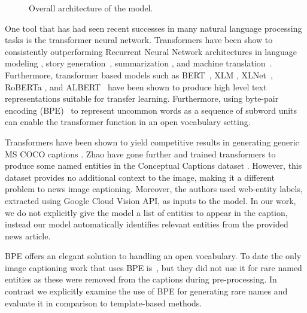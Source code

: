 
\begin{figure*}[t]
    \begin{center}
    \fbox{\rule{0pt}{2in} \rule{.9\linewidth}{0pt}}
    \end{center}
       \caption{Overall architecture of the model.}
    \label{fig:short}
 \end{figure*}

One tool that has had seen recent successes in many natural language processing
tasks is the transformer neural network.
Transformers have been show to consistently
outperforming Recurrent Neural Network architectures in language modeling
\cite{Radford2019LanguageMA},
story generation~\cite{Fan2018HierarchicalNS}, summarization
\cite{Subramanian2019OnEA}, and machine translation~\cite{Bojar2018Findings}.
Furthermore, transformer based models such as BERT~\cite{Devlin2019BERT}, XLM
\cite{Lample2019CrosslingualLM}, XLNet~\cite{Yang2019XLNetGA}, RoBERTa
\cite{Liu2019RoBERTaAR}, and ALBERT~\cite{Lan2019ALBERT} have been shown to
produce high level text representations suitable for transfer learning.
Furthermore, using byte-pair
encoding (BPE)~\cite{Sennrich2015NeuralMT} to represent uncommon words as a
sequence of subword units can enable the transformer function in an open
vocabulary setting.

Transformers have been shown
to yield competitive results in generating generic MS COCO captions
\cite{Zhu2018CaptioningTW, Li2019Boosted}. Zhao \etal
\cite{Zhao2019InformativeIC} have gone further and trained transformers to
produce some named entities in the Conceptual Captions dataset
\cite{Sharma2018ConceptualCA}. However, this dataset provides no additional
context to the image, making it a different problem to news image captioning.
Moreover, the authors used web-entity labels,
extracted using Google Cloud Vision API, as inputs to the model. In our work,
we do not explicitly give the model a list of
entities to appear in the caption, instead our model automatically identifies
relevant entities from the provided news article.

BPE offers an elegant solution to handling an open vocabulary. To date the only
image captioning work that uses BPE is~\cite{Zhao2019InformativeIC}, but they
did not use it for rare named entities as these were removed from
the captions during pre-processing. In contrast we explicitly examine the use
of BPE for generating rare names and evaluate it in comparison to
template-based methods.

